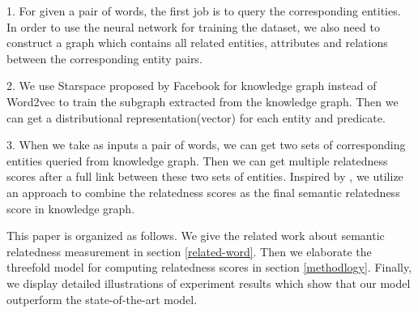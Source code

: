 1. For given a pair of words, the first job is to query the corresponding entities. In order to use the
neural network for training the dataset, we also need to construct a graph which contains all related
entities, attributes and relations between the corresponding entity pairs.

2. We use Starspace proposed by Facebook for knowledge graph instead of Word2vec to train the subgraph
extracted from the knowledge graph. Then we can get a distributional representation(vector) for each
entity and predicate. 

3. When we take as inputs a pair of words, we can get two sets of corresponding entities queried from
knowledge graph. Then we can get multiple relatedness scores after a full link between these two sets of entities.
Inspired by \cite{acl/IacobacciPN15}, we utilize an approach to combine the 
relatedness scores as the final semantic relatedness score in knowledge graph.

This paper is organized as follows. We give the related work about semantic relatedness
measurement in section \ref{related-word}. Then we elaborate the threefold model for
computing relatedness scores in section \ref{methodlogy}. Finally, we display detailed
illustrations of experiment results which show that our model outperform the state-of-the-art model.